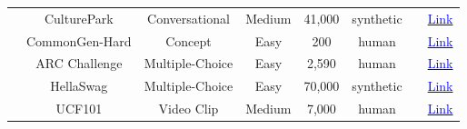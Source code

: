 \begin{table}[!htp]
{\begin{tabular}{c|c|c|c|c|c|c|c}
                                                                                  & CulturePark            & Conversational          & Medium              & 41,000           & synthetic           & \cite{li2024culturepark}                                                                                                                                                        & \href{https://github.com/Scarelette/CulturePark}{\textcolor{blue}{Link}}                                                                                          \\ \cline{2-8}
                                                                                  & CommonGen-Hard         & Concept                 & Easy                & 200              & human               & \cite{chen2023agentverse,yukhymenko2024synthetic}                                                                             & \href{https://github.com/madaan/self-refine}{\textcolor{blue}{Link}}                                                                                              \\ \cline{2-8}
                                                                                  & ARC Challenge          & Multiple-Choice         & Easy                & 2,590            & human               & \cite{tan2024true}                                                                                                                                                              & \href{https://huggingface.co/datasets/allenai/ai2_arc}{\textcolor{blue}{Link}}                                                                                    \\ \cline{2-8}
                                                                                  & HellaSwag              & Multiple-Choice         & Easy                & 70,000           & synthetic           & \cite{tan2024true}                                                                                                                                                              & \href{https://rowanzellers.com/hellaswag/}{\textcolor{blue}{Link}}                                                                                                \\ \cline{2-8}
                                                                                  & UCF101                 & Video Clip              & Medium              & 7,000            & human               & \cite{xie2024dreamfactory}                                                                                                                                                      & \href{https://www.crcv.ucf.edu/data/UCF101.php}{\textcolor{blue}{Link}}                                                                                           \\ \cline{2-8}

\end{tabular}}
\end{table}

